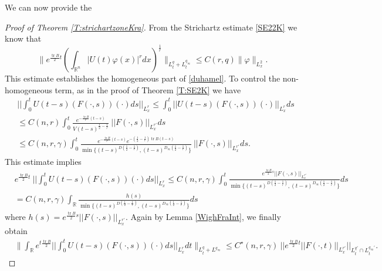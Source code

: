 \documentclass[11pt,letter]{amsart}
\def \R {\mathbb{R}}
\def \vf{\varphi}
\newcommand{\Rn}{\mathbb R^n}
\numberwithin{equation}{section}
\newcommand{\tr}{\operatorname{tr}}
\numberwithin{equation}{section}
\begin{document}
\medskip

We can now provide the

\begin{proof}[Proof of Theorem \ref{T:strichartzoneKra}]
From the Strichartz estimate \eqref{SE22K} we know that
\begin{equation}\label{woww}
\|e^{\frac{\tr B}2 t}  \left(\int_{\Rn}|U(t)\vf(x)|^r dx\right)^{\frac{1}{r}}\|_{L^{q}_{t}+L^{q_{\infty}}_{t}} \le C(r,q) \|\vf\|_{L^2_x}.
\end{equation}
This estimate establishes the homogeneous part of \eqref{duhamel}. To control the non-homogeneous term, as in the proof of Theorem \ref{T:SE2K} we have
\begin{align*}
& ||\int_0^t U(t-s)(F(\cdot,s))(\cdot) ds||_{L^r_x}\le \int_0^t ||U(t-s)(F(\cdot,s))(\cdot)||_{L^r_x} ds
\\
& \le C(n,r) \int_0^t \frac{e^{-\frac{\tr B}{r}(t-s)}}{V(t-s)^{\frac 12 - \frac 1{r}}}\ ||F(\cdot,s)||_{L^{r'}_x} ds
\\
& \le C(n,r,\gamma) \int_0^t \frac{e^{-\frac{\tr B}{r}(t-s)} e^{-\left(\frac 12 - \frac 1{r}\right) \tr B (t-s)}}{\min\{(t-s)^{D\left(\frac 12 - \frac 1{r}\right)},(t-s)^{D_{\infty}\left(\frac 12 - \frac 1{r}\right)}\}}\ ||F(\cdot,s)||_{L^{r'}_x} ds.
\end{align*}
This estimate implies 
\begin{align*}
& e^{\frac{\tr B}{2} t}\ ||\int_0^t U(t-s)(F(\cdot,s))(\cdot) ds||_{L^r_x} \le C(n,r,\gamma) \int_0^t \frac{e^{\frac{\tr B}{2} s} ||F(\cdot,s)||_{L^{r'}_x}}{\min\{(t-s)^{D\left(\frac 12 - \frac 1{r}\right)},(t-s)^{D_{\infty}\left(\frac 12 - \frac 1{r}\right)}\}} ds
\\
& = C(n,r,\gamma) \int_\R \frac{h(s)}{\min\{(t-s)^{D\left(\frac 12 - \frac 1{r}\right)},(t-s)^{D_{\infty}\left(\frac 12 - \frac 1{r}\right)}\}} ds
\end{align*}
where $
h(s) = e^{\frac{\tr B}{2} s} ||F(\cdot,s)||_{L^{r'}_x}.$
Again by Lemma \ref{WighFraInt}, we finally obtain
\begin{align*}
& \|\int_\R e^{t \frac{\tr B}2} ||\int_0^t U(t-s)(F(\cdot,s))(\cdot) ds||_{L^r_x} dt\|_{L^{q}_{t}+L^{q_{\infty}}}
\le C^\star(n,r,\gamma)\ ||e^{\frac{\tr B}{2} t} ||F(\cdot,t)||_{L^{r'}_x}||_{L^{q'}_t\cap L^{q_{\infty}'}_{t}}.
\end{align*}

\end{proof}

\vskip 0.2in
\end{document}
